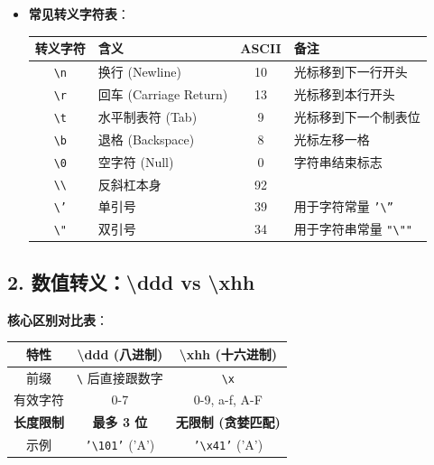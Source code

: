 \documentclass[a4paper,12pt]{article}
\begin{document}
\begin{itemize}
    \item \textbf{常见转义字符表}：
    \begin{center}
    \begin{tabular}{|c|l|c|l|}
    \hline
    \textbf{转义字符} & \textbf{含义} & \textbf{ASCII} & \textbf{备注} \\
    \hline
    \texttt{\textbackslash n} & 换行 (Newline) & 10 & 光标移到下一行开头 \\
    \hline
    \texttt{\textbackslash r} & 回车 (Carriage Return) & 13 & 光标移到本行开头 \\
    \hline
    \texttt{\textbackslash t} & 水平制表符 (Tab) & 9 & 光标移到下一个制表位 \\
    \hline
    \texttt{\textbackslash b} & 退格 (Backspace) & 8 & 光标左移一格 \\
    \hline
    \texttt{\textbackslash 0} & 空字符 (Null) & 0 & 字符串结束标志 \\
    \hline
    \texttt{\textbackslash \textbackslash} & 反斜杠本身 & 92 & \\
    \hline
    \texttt{\textbackslash '} & 单引号 & 39 & 用于字符常量 \texttt{'\textbackslash ''} \\
    \hline
    \texttt{\textbackslash "} & 双引号 & 34 & 用于字符串常量 \texttt{"\textbackslash ""} \\
    \hline
    \end{tabular}
    \end{center}
\end{itemize}

\subsection{2. 数值转义：\textbackslash ddd vs \textbackslash xhh}
\textbf{核心区别对比表}：
\begin{center}
\begin{tabular}{|c|c|c|}
\hline
\textbf{特性} & \textbf{\textbackslash ddd (八进制)} & \textbf{\textbackslash xhh (十六进制)} \\
\hline
前缀 & \texttt{\textbackslash} 后直接跟数字 & \texttt{\textbackslash x} \\
\hline
有效字符 & 0-7 & 0-9, a-f, A-F \\
\hline
\textbf{长度限制} & \textbf{最多 3 位} & \textbf{无限制 (贪婪匹配)} \\
\hline
示例 & \texttt{'\textbackslash 101'} ('A') & \texttt{'\textbackslash x41'} ('A') \\
\hline
\end{tabular}
\end{center}
\end{document}

